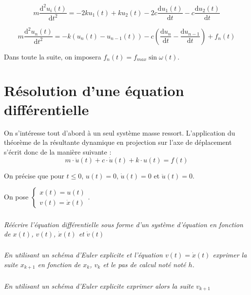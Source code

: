 \documentclass[10pt]{article}
\newif\ifprof
\begin{document}
$$
m\dfrac{\text{d}^2u_i(t)}{\text{d}t^2} = 
- 2k u_1(t) + k u_2 (t) 
-2c \dfrac{\text{d}u_1(t)}{\text{d}t} 
- c \dfrac{\text{d}u_2(t)}{\text{d}t} 
$$

$$
m\dfrac{\text{d}^2u_n(t)}{\text{d}t^2} = 
-k\left(u_n(t)-u_{n-1}(t) \right)   - c\left(\dfrac{\text{d}u_{n}}{\text{d}t}-\dfrac{\text{d}u_{n-1}}{\text{d}t} \right) +f_n(t)
$$


Dans toute la suite, on imposera $f_n(t)=f_{max} \sin \omega \left(t\right)$.

\section{Résolution d'une équation différentielle}
On s'intéresse tout d'abord à un seul système masse ressort. L'application du théorème de la résultante dynamique en projection sur l'axe de déplacement s'écrit donc 
de la manière suivante : 
$$
m\cdot\ddot{u}(t)+c\cdot \dot{u}(t) + k\cdot u(t) = f(t)
$$

On précise que pour $t\leq 0$, $u(t)=0$, $\dot{u}(t)=0$ et $\ddot{u}(t)=0$.

On pose $\left\{ \begin{array}{l} x(t) = u(t) \\ v(t) = \dot{x}(t)\end{array} \right.$.

\subparagraph{}
\textit{Réécrire l'équation différentielle sous forme d'un système d'équation en fonction de $x(t)$,  $v(t)$, $\dot{x}(t)$ et $\dot{v}(t)$}
\ifprof
\begin{corrige}
On a donc : 
$$
\left\{ 
\begin{array}{l} 
v(t) = \dot{x}(t) \\ 
m\cdot\dot{v}(t)+c\cdot {v}(t) + k\cdot x(t) = f(t)
\end{array} \right.
$$
\end{corrige}
\else
\fi

\subparagraph{}
\textit{En utilisant un schéma d'Euler explicite et l'équation $v(t) = \dot{x}(t)$ 
exprimer la suite $x_{k+1}$ en fonction de $x_k$, $v_k$ et le pas de calcul noté noté $h$.}

\ifprof
\begin{corrige}
On a $\dfrac{dx(t)}{dt} \simeq \dfrac{x_{k+1}-x_k}{h}$. On a donc 
$v_k = \dfrac{x_{k+1}-x_k}{h} \Longleftrightarrow x_{k+1} = h\cdot v_k + x_k$.
\end{corrige}
\else
\fi

\subparagraph{}
\textit{En utilisant un schéma d'Euler explicite exprimer alors la suite $v_{k+1}$}

\ifprof
\begin{corrige}
On a $\dfrac{dv(t)}{dt} \simeq \dfrac{v_{k+1}-v_k}{h}$.  En conséquences, 
$m\cdot\dot{v}(t)+c\cdot {v}(t) + k\cdot x(t) = f(t)$
peut donc se mettre sous la forme suivante :

$$
m\cdot\dfrac{v_{k+1}-v_k}{h}+c\cdot {v_k} + k\cdot x_k = f_k
\Longleftrightarrow 
m\cdot {v_{k+1}}  = f_k h - kh\cdot x_k - c h\cdot {v_k}+v_k
\Longleftrightarrow
 {v_{k+1}}  = \dfrac{h}{m} f_k - \dfrac{kh}{m}x_k +\dfrac{1-ch}{m}v_k
$$
\end{corrige}
\else
\fi
\end{document}
